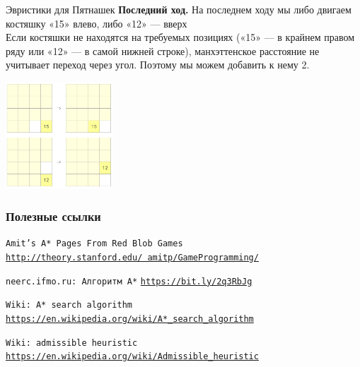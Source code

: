 \documentclass[10pt]{beamer}
\begin{document}
\begin{frame}[fragile]{Эвристики для Пятнашек}
\textbf{Последний ход.} На последнем ходу мы либо двигаем костяшку «15» влево, либо «12» — вверх
\\
Если костяшки не находятся на требуемых позициях («15» — в крайнем правом ряду или «12» — в самой нижней строке), манхэттенское расстояние не учитывает переход через угол. Поэтому мы можем добавить к нему 2.
\begin{center}
\includegraphics[width=4cm]{Term_2/Source/images/last_move.png}
\end{center}
\end{frame}




\appendix

\begin{frame}[allowframebreaks]
  \frametitle<presentation>{Полезные ссылки}
    
  \begin{thebibliography}{10}
{
  \beamertemplatebookbibitems
    
  \texttt{Amit’s A* Pages From Red Blob Games}
  \newblock \href{http://theory.stanford.edu/~amitp/GameProgramming/}{\texttt{http://theory.stanford.edu/~amitp/GameProgramming/}}

  \texttt{neerc.ifmo.ru: Алгоритм A*}
  \newblock \href{https://bit.ly/2q3RbJg}{\texttt{https://bit.ly/2q3RbJg}}
  
  \texttt{Wiki: A* search algorithm}
  \newblock \href{https://en.wikipedia.org/wiki/A*_search_algorithm}{\texttt{https://en.wikipedia.org/wiki/A*\_search\_algorithm}}
  
  \texttt{Wiki: admissible heuristic}
  \newblock \href{https://en.wikipedia.org/wiki/Admissible_heuristic}{\texttt{https://en.wikipedia.org/wiki/Admissible\_heuristic}}
  
  
  
}
    
  \end{thebibliography}
\end{frame}
\end{document}

